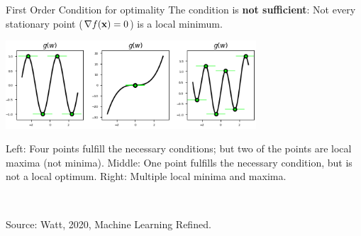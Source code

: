 \documentclass[11pt,compress,t,notes=noshow, xcolor=table]{beamer}
\begin{document}
\begin{vbframe}{First Order Condition for optimality}
  The condition is \textbf{not sufficient}: Not every stationary point ($\nabla f(\mathbf{x}) = 0$) is a local minimum. 
  
  \begin{center}
  \includegraphics[width = 0.7\textwidth]{figure_man/saddle_points_2.png} \\
  \begin{footnotesize}
  Left: Four points fulfill the necessary conditions; but two of the points are local maxima (not minima). Middle: One point fulfills the necessary condition, but is not a local optimum. Right: Multiple local minima and maxima. 
  \end{footnotesize}\\
  \begin{tiny}
  Source: Watt, 2020, Machine Learning Refined. 
  \end{tiny}
  \end{center}
  
  \end{vbframe}
  
\end{document}
